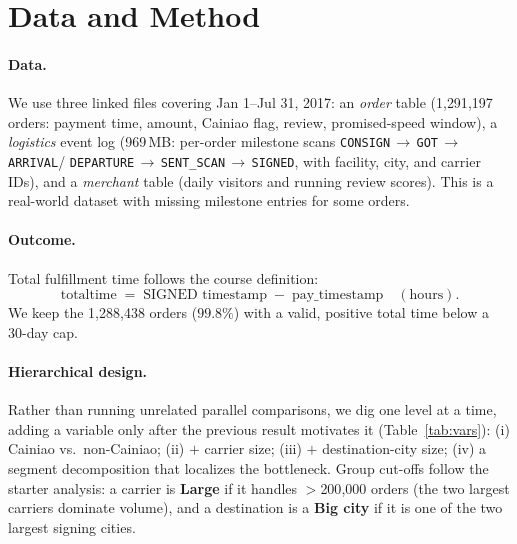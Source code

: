 \documentclass[11pt]{article}
\begin{document}
\section{Data and Method}

\paragraph{Data.} We use three linked files covering Jan 1--Jul 31, 2017:
an \emph{order} table (1{,}291{,}197 orders: payment time, amount, Cainiao flag,
review, promised-speed window), a \emph{logistics} event log (969\,MB: per-order
milestone scans \texttt{CONSIGN}\,$\to$\,\texttt{GOT}\,$\to$\,\texttt{ARRIVAL}/
\texttt{DEPARTURE}\,$\to$\,\texttt{SENT\_SCAN}\,$\to$\,\texttt{SIGNED}, with
facility, city, and carrier IDs), and a \emph{merchant} table (daily visitors and
running review scores). This is a real-world dataset with missing milestone entries
for some orders.

\paragraph{Outcome.} Total fulfillment time follows the course definition:
\[
\text{totaltime} \;=\; \text{SIGNED timestamp} \;-\; \text{pay\_timestamp}
\quad(\text{hours}).
\]
We keep the 1{,}288{,}438 orders ($99.8\%$) with a valid, positive total time
below a 30-day cap.

\paragraph{Hierarchical design.} Rather than running unrelated parallel
comparisons, we dig one level at a time, adding a variable only after the previous
result motivates it (Table~\ref{tab:vars}):
(i) Cainiao vs.\ non-Cainiao; (ii) $+$ carrier size; (iii) $+$ destination-city
size; (iv) a segment decomposition that localizes the bottleneck. Group cut-offs
follow the starter analysis: a carrier is \textbf{Large} if it handles
$>$200{,}000 orders (the two largest carriers dominate volume), and a destination
is a \textbf{Big city} if it is one of the two largest signing cities.
\end{document}
